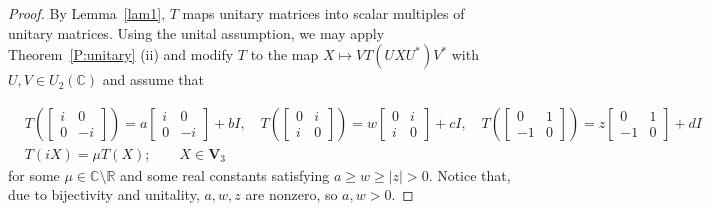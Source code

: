 \documentclass[10pt,a4paper]{amsart}
\def\IC{{\mathbb C}}
\def\IR{{\mathbb R}}
\def\bV{{\mathbf V}}
\begin{document}
\begin{proof}
    By Lemma~\ref{lam1}, $T$ maps unitary matrices into scalar multiples of unitary matrices.
Using the unital assumption, we may apply Theorem~\ref{P:unitary} (ii)
 and modify $T$ to the map $X \mapsto VT(UXU^*)V^*$ with $U, V \in U_2(\IC)$ and assume that

\begin{equation}\label{eq:AB*-on-2-by-2anew}
\begin{aligned}
  &T \left( \left[\begin{smallmatrix} i & 0 \\ 0 & -i \end{smallmatrix}\right] \right) = a \left[\begin{smallmatrix} i & 0 \\ 0 & -i \end{smallmatrix}\right] +bI,\quad T \left( \left[\begin{smallmatrix} 0 & i \\ i & 0 \end{smallmatrix}\right] \right) = w\left[\begin{smallmatrix} 0 & i \\ i & 0 \end{smallmatrix}\right] +cI, \quad T \left( \left[\begin{smallmatrix} 0 & 1 \\ -1 & 0 \end{smallmatrix}\right] \right) = z\left[\begin{smallmatrix} 0 & 1 \\ -1 & 0 \end{smallmatrix}\right] + dI\\
  &T(iX)=\mu T(X);\qquad X\in\bV_3
\end{aligned}
\end{equation}
for some $\mu\in\IC\setminus\IR$ and some real constants satisfying $a\ge w\ge|z| > 0$. Notice that, due to bijectivity and unitality, $a, w, z$  are nonzero, so $a,w>0$.



\end{proof}
\end{document}
